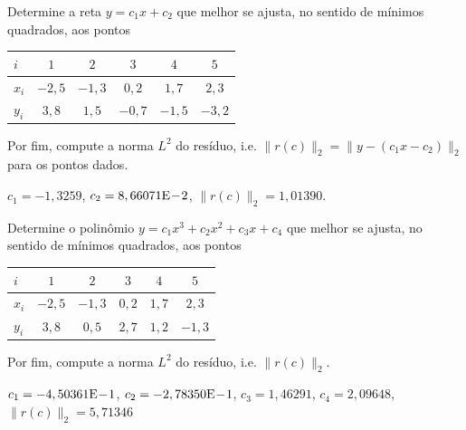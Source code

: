 \begin{exer}\label{exer:mq_reta}
  Determine a reta $y = c_1x + c_2$ que melhor se ajusta, no sentido de mínimos quadrados, aos pontos
  \begin{center}
    \begin{tabular}{l|ccccc}
      $i$ & $1$ & $2$ & $3$ & $4$ & $5$ \\\hline
      $x_i$ & $-2,5$ & $-1,3$ & $0,2$ & $1,7$ & $2,3$\\
      $y_i$ & $3,8$ & $1,5$ & $-0,7$ & $-1,5$ & $-3,2$\\\hline
    \end{tabular}
  \end{center}
Por fim, compute a norma $L^2$ do resíduo, i.e. $\|r(c)\|_2 = \|y - (c_1x - c_2)\|_2$ para os pontos dados.
\end{exer}
\begin{resp}
  $c_1 = -1,3259$, $c_2 = 8,66071\mathrm{E}\!-\!2$, $\|r(c)\|_2 = 1,01390$.
\end{resp}

\begin{exer}\label{exer:mq_poli}
  Determine o polinômio $y = c_1x^3 + c_2x^2 + c_3x + c_4$ que melhor se ajusta, no sentido de mínimos quadrados, aos pontos
  \begin{center}
    \begin{tabular}{l|ccccc}
      $i$ & $1$ & $2$ & $3$ & $4$ & $5$ \\\hline
      $x_i$ & $-2,5$ & $-1,3$ & $0,2$ & $1,7$ & $2,3$\\
      $y_i$ & $3,8$ & $0,5$ & $2,7$ & $1,2$ & $-1,3$\\\hline
    \end{tabular}
  \end{center}
Por fim, compute a norma $L^2$ do resíduo, i.e. $\|r(c)\|_2$.
\end{exer}
\begin{resp}
  $c_1 = -4,50361\mathrm{E}\!-\!1$, $c_2 = -2,78350\mathrm{E}\!-\!1$, $c_3 = 1,46291$, $c_4 = 2,09648$, $\|r(c)\|_2 = 5,71346$
\end{resp}

